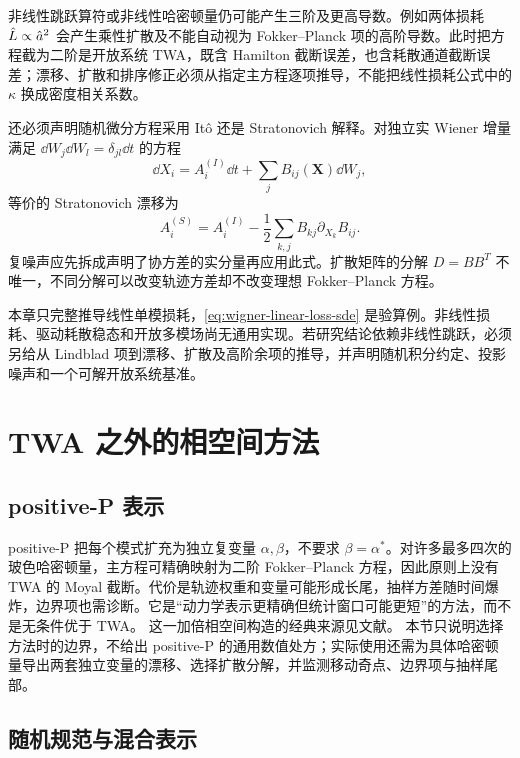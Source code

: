 非线性跳跃算符或非线性哈密顿量仍可能产生三阶及更高导数。例如两体损耗 $\hat L\propto\hat a^2$ 会产生乘性扩散及不能自动视为 Fokker--Planck 项的高阶导数。此时把方程截为二阶是开放系统 TWA，既含 Hamilton 截断误差，也含耗散通道截断误差；漂移、扩散和排序修正必须从指定主方程逐项推导，不能把线性损耗公式中的 $\kappa$ 换成密度相关系数。

还必须声明随机微分方程采用 It\^o 还是 Stratonovich 解释。对独立实 Wiener 增量满足 $\dd W_j\dd W_l=\delta_{jl}\dd t$ 的方程
\begin{equation}
  \dd X_i=A_i^{(I)}\dd t+\sum_jB_{ij}(\bm X)\dd W_j,
\end{equation}
等价的 Stratonovich 漂移为
\begin{equation}
  A_i^{(S)}=A_i^{(I)}-\frac12\sum_{k,j}B_{kj}\partial_{X_k}B_{ij}.
  \label{eq:ito-stratonovich-drift-conversion}
\end{equation}
复噪声应先拆成声明了协方差的实分量再应用此式。扩散矩阵的分解 $D=BB^T$ 不唯一，不同分解可以改变轨迹方差却不改变理想 Fokker--Planck 方程。

\begin{chaptercheck}
本章只完整推导线性单模损耗，\cref{eq:wigner-linear-loss-sde} 是验算例。非线性损耗、驱动耗散稳态和开放多模场尚无通用实现。若研究结论依赖非线性跳跃，必须另给从 Lindblad 项到漂移、扩散及高阶余项的推导，并声明随机积分约定、投影噪声和一个可解开放系统基准。
\end{chaptercheck}

\section{TWA 之外的相空间方法}

\subsection{positive-P 表示}

positive-P 把每个模式扩充为独立复变量 $\alpha,\beta$，不要求
$\beta=\alpha^*$。对许多最多四次的玻色哈密顿量，主方程可精确映射为二阶 Fokker--Planck 方程，因此原则上没有 TWA 的 Moyal 截断。代价是轨迹权重和变量可能形成长尾，抽样方差随时间爆炸，边界项也需诊断。它是“动力学表示更精确但统计窗口可能更短”的方法，而不是无条件优于 TWA。
这一加倍相空间构造的经典来源见文献\cite{Drummond1980}。
本节只说明选择方法时的边界，不给出 positive-P 的通用数值处方；实际使用还需为具体哈密顿量导出两套独立变量的漂移、选择扩散分解，并监测移动奇点、边界项与抽样尾部。

\subsection{随机规范与混合表示}


